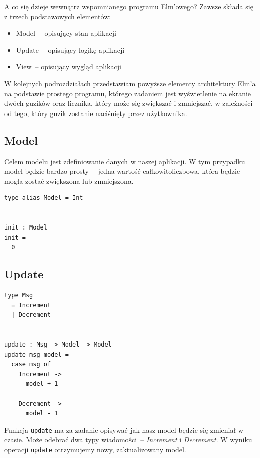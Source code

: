 \documentclass[twoside,a4paper]{report}
\begin{document}
A co się dzieje wewnątrz wspomnianego programu Elm'owego? Zawsze składa się z trzech podstawowych elementów:
\begin{itemize}
    \setlength\itemsep{-0.1em}
    \item Model~-- opisujący stan aplikacji
    \item Update~-- opisujący logikę aplikacji
    \item View~-- opisujący wygląd aplikacji
\end{itemize}
W kolejnych podrozdziałach przedstawiam powyższe elementy architektury Elm'a na podstawie prostego programu, którego zadaniem jest wyświetlenie na ekranie dwóch guzików oraz licznika, który może się zwiększać i zmniejszać, w zależności od tego, który guzik zostanie naciśnięty przez użytkownika.

\subsection{Model}
\begin{minipage}{.50\textwidth}
    Celem modelu jest zdefiniowanie danych w naszej aplikacji.
    W tym przypadku model będzie bardzo prosty~-- jedna wartość całkowitoliczbowa, która będzie mogła zostać zwiększona lub zmniejszona.
\end{minipage}\hfill
\begin{minipage}{.43\textwidth}
    \lstset{frame=single}
    \begin{lstlisting}[caption={\textit{The Elm Architecture} - Model},label=kod:Model]
type alias Model = Int


init : Model
init =
  0
    \end{lstlisting}
\end{minipage}\hfill

\subsection{Update}
\begin{minipage}{.43\textwidth}
    \lstset{frame=single}
    \begin{lstlisting}[caption={\textit{The Elm Architecture} - Update},label=kod:Update]
type Msg
  = Increment
  | Decrement


update : Msg -> Model -> Model
update msg model =
  case msg of
    Increment ->
      model + 1

    Decrement ->
      model - 1
    \end{lstlisting}
\end{minipage}\hfill
\begin{minipage}{.50\textwidth}
    Funkcja \texttt{update} ma za zadanie opisywać jak nasz model będzie się zmieniał w czasie.
    Może odebrać dwa typy wiadomości~-- \textit{Increment} i \textit{Decrement}.
    W wyniku operacji \texttt{update} otrzymujemy nowy, zaktualizowany model.
\end{minipage}\hfill
\end{document}

